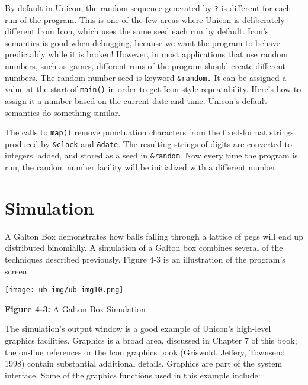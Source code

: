 By default in Unicon, the random sequence generated by \texttt{?} is
different for each run of the program. This is one of the few areas
where Unicon is deliberately different from Icon, which uses the same
seed each run by default. Icon's semantics is good
when debugging, because we want the program to behave predictably while
it is broken! However, in most applications that use random numbers,
such as games, different runs of the program should create different
numbers. The random number seed is keyword
\texttt{\&random.} It can be assigned a value at the start of
\texttt{main()} in order to get Icon-style repeatability. Here's how
to assign it a number based on the current date and time.
Unicon's default semantics do something similar.


\noindent
The calls to \texttt{map()} remove punctuation characters from the
fixed-format strings produced by \texttt{\&clock} and \texttt{\&date}.
The resulting strings of digits are converted to integers, added, and
stored as a seed in \texttt{\&random}. Now every time the program is
run, the random number facility will be initialized with a different
number.

\section{Simulation}

A Galton Box demonstrates how balls falling through a
lattice of pegs will end up distributed binomially. A simulation of a
Galton box combines several of the techniques described previously.
Figure 4-3 is an illustration of the program's
screen.
\begin{center}
\texttt{[image: ub-img/ub-img10.png]}
\end{center}

{\sffamily\bfseries Figure 4-3:}
{\sffamily A Galton Box Simulation}

\bigskip

The simulation's output window is a good example of
Unicon's high-level graphics facilities. Graphics is a
broad area, discussed in Chapter 7 of this book; the on-line references
or the Icon graphics book (Griswold, Jeffery, Townsend 1998) contain
substantial additional details. Graphics are part of the system
interface. Some of the graphics functions used in this example include:

